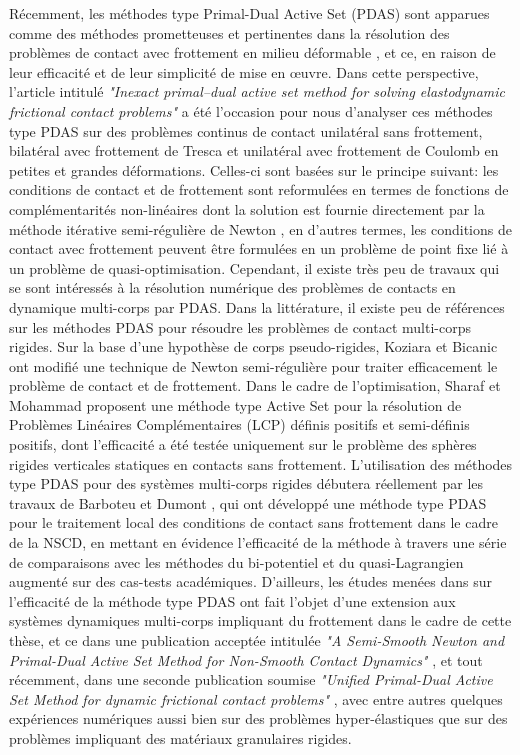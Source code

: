 Récemment, les méthodes type Primal-Dual Active Set (PDAS) sont apparues comme des méthodes prometteuses et pertinentes dans la résolution des problèmes de contact avec frottement en milieu déformable \cite{hintermuller2002primal,hueber2008primal,hueber2005primal}, et ce, en raison de leur efficacité et de leur simplicité de mise en œuvre. Dans cette perspective, l'article intitulé \textit{"Inexact primal–dual active set method for solving elastodynamic frictional contact problems"} \cite{abide2021inexact} a été l'occasion pour nous d'analyser ces méthodes type PDAS sur des problèmes continus de contact unilatéral sans frottement, bilatéral avec frottement de Tresca et unilatéral avec frottement de Coulomb en petites et grandes déformations. Celles-ci sont basées sur le principe suivant: les conditions de contact et de frottement sont reformulées en termes de fonctions de complémentarités non-linéaires dont la solution est fournie directement par la méthode itérative semi-régulière de Newton \cite{hintermuller2002primal, hintermuller2003semismooth}, en d'autres termes, les conditions de contact avec frottement peuvent être formulées en un problème de point fixe lié à un problème de quasi-optimisation. Cependant, il existe très peu de travaux qui se sont intéressés à la résolution numérique des problèmes de contacts en dynamique multi-corps par PDAS. Dans la littérature, il existe peu de références sur les méthodes PDAS pour résoudre les problèmes de contact multi-corps rigides. Sur la base d'une hypothèse de corps pseudo-rigides, Koziara et Bicanic \cite{koziara2008semismooth} ont modifié une technique de Newton semi-régulière pour traiter efficacement le problème de contact et de frottement. Dans le cadre de l'optimisation, Sharaf et Mohammad \cite{sharaf2016active} proposent une méthode type Active Set pour la résolution de Problèmes Linéaires Complémentaires (LCP) définis positifs et semi-définis positifs, dont l'efficacité a été testée uniquement sur le problème des sphères rigides verticales statiques en contacts sans frottement. L'utilisation des méthodes type PDAS pour des systèmes multi-corps rigides débutera réellement par les travaux de Barboteu et Dumont \cite{barboteu2018primal}, qui ont développé une méthode type PDAS pour le traitement local des conditions de contact sans frottement dans le cadre de la NSCD, en mettant en évidence l'efficacité de la méthode à travers une série de comparaisons avec les méthodes du bi-potentiel et du quasi-Lagrangien augmenté sur des cas-tests académiques. D'ailleurs, les études menées dans \cite{barboteu2018primal} sur l'efficacité de la méthode type PDAS ont fait l'objet d'une extension aux systèmes dynamiques multi-corps impliquant du frottement dans le cadre de cette thèse, et ce dans une publication acceptée intitulée \textit{"A Semi-Smooth Newton and Primal-Dual Active Set Method for Non-Smooth Contact Dynamics"} \cite{abide2021semismooth}, et tout récemment, dans une seconde publication soumise \textit{"Unified Primal-Dual Active Set Method for dynamic frictional contact problems"} \cite{abide2021unified}, avec entre autres quelques expériences numériques aussi bien sur des problèmes hyper-élastiques que sur des problèmes impliquant des matériaux granulaires rigides.\\

